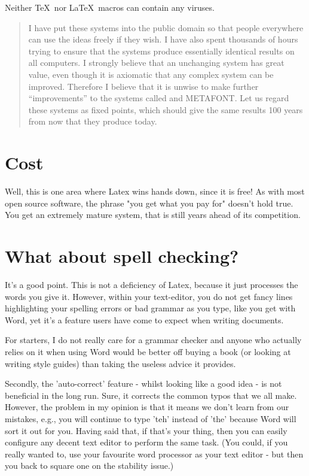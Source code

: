 Neither \TeX\  nor \LaTeX\   macros can contain any viruses.

\begin{quotation}
I have put these systems into the public domain so that
people everywhere can use the ideas freely if they wish.
I have also spent thousands of hours trying to ensure
that the systems produce essentially identical results on
all computers. I strongly believe that an unchanging
system has great value, even though it is axiomatic that
any complex system can be improved. Therefore I believe
that it is unwise to make further “improvements”
to the systems called \tex and METAFONT. Let us regard
these systems as fixed points, which should give
the same results 100 years from now that they produce
today.
\end{quotation}

\section{Cost}

Well, this is one area where Latex wins hands down, since it is free! As with most open source software, the phrase "you get what you pay for" doesn't hold true. You get an extremely mature system, that is still years ahead of its competition.

\section{What about spell checking?}

It's a good point. This is not a deficiency of Latex, because it just processes the words you give it. However, within your text-editor, you do not get fancy lines highlighting your spelling errors or bad grammar as you type, like you get with Word, yet it's a feature users have come to expect when writing documents.

For starters, I do not really care for a grammar checker and anyone who actually relies on it when using Word would be better off buying a book (or looking at writing style guides) than taking the useless advice it provides.

Secondly, the 'auto-correct' feature - whilst looking like a good idea - is not beneficial in the long run. Sure, it corrects the common typos that we all make. However, the problem in my opinion is that it means we don't learn from our mistakes, e.g., you will continue to type 'teh' instead of 'the' because Word will sort it out for you. Having said that, if that's your thing, then you can easily configure any decent text editor to perform the same task. (You could, if you really wanted to, use your favourite word processor as your text editor - but then you back to square one on the stability issue.)

